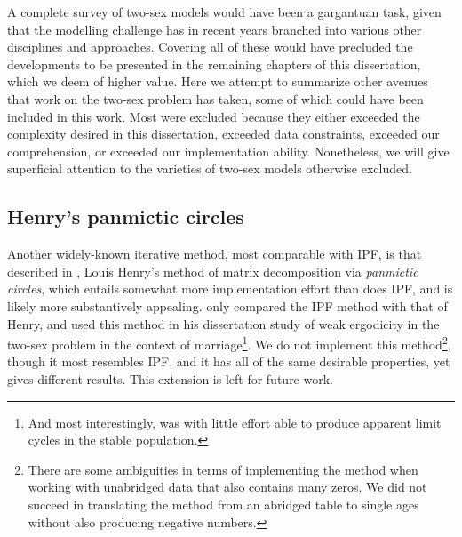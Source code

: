 
A complete survey of two-sex models would have been a gargantuan task, given
that the modelling challenge has in recent years branched into various other
disciplines and approaches. Covering all of these would have precluded the
developments to be presented in the remaining chapters of this dissertation,
which we deem of higher value. Here we attempt to summarize other avenues that
work on the two-sex problem has taken, some of which could have been included in this work. Most were excluded because they either exceeded the
complexity desired in this dissertation, exceeded data constraints, exceeded our
comprehension, or exceeded our implementation ability. Nonetheless, we will give
superficial attention to the varieties of two-sex models otherwise excluded.

\subsection{Henry's panmictic circles} 
Another widely-known iterative method, 
most comparable with IPF, is that described in \citet{henry1972nuptiality},
Louis Henry's method of matrix decomposition via \textit{panmictic circles}, which entails somewhat more
implementation effort than does IPF, and is likely more substantively appealing. 
\citet{mc1975models} only compared the
IPF method with that of Henry, and \citet{wijewickrema1980weak} used this method 
in his dissertation study of weak ergodicity in the two-sex problem in the
context of marriage\footnote{And most interestingly, was with little
effort able to produce apparent limit cycles in the stable population.}. We do
not implement this method\footnote{There are some ambiguities in terms of 
implementing the method when working with unabridged data that also contains 
many zeros. We did not succeed in translating the method from an
abridged table to single ages without also producing negative numbers.}, though
it most resembles IPF, and it has all of the same desirable properties, yet
gives different results. This extension is left for future work.

